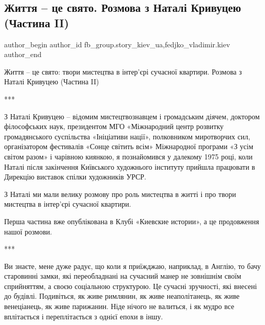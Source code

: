  
 
 
 
 
 
\subsection{Життя – це свято. Розмова з Наталі Кривуцею (Частина II)}
\label{sec:14_12_2021.fb.fb_group.story_kiev_ua.3.natali_krivuca_chast_dva}
 
\ifcmt
 author_begin
   author_id fb_group.story_kiev_ua,fedjko_vladimir.kiev
 author_end
\fi

Життя – це свято: твори мистецтва в інтер'єрі сучасної квартири.  Розмова з
Наталі Кривуцею (Частина II)

***

З Наталі Кривуцею – відомим мистецтвознавцем і громадським діячем, доктором
філософських наук, президентом МГО «Міжнародний центр розвитку громадянського
суспільства «Ініціативи нації», полковником миротворчих сил, організатором
фестивалів «Сонце світить всім» Міжнародної програми «З усім світом разом» і
чарівною киянкою, я познайомився у далекому 1975 році, коли Наталі після
закінчення Київського художнього інституту прийшла працювати в Дирекцію
виставок спілки художників УРСР.

З Наталі ми мали велику розмову про роль мистецтва в житті і про твори
мистецтва в інтер’єрі сучасної квартири. 

Перша частина вже опублікована в Клубі «Киевские истории», а це продовження
нашої розмови.

***

Ви знаєте, мене дуже радує, що коли я приїжджаю, наприклад, в Англію, то бачу
старовинні замки, які переобладнані на сучасний манер не зовнішнім своїм
сприйняттям, а своєю соціальною структурою. Це сучасні зручності, які внесені
до будівлі. Подивіться, як живе римлянин, як живе неаполітанець, як живе
венеціанець, як живе парижанин. Ніде нічого не валиться, і як мудро все
вплітається і переплітається з однієї епохи в іншу.

